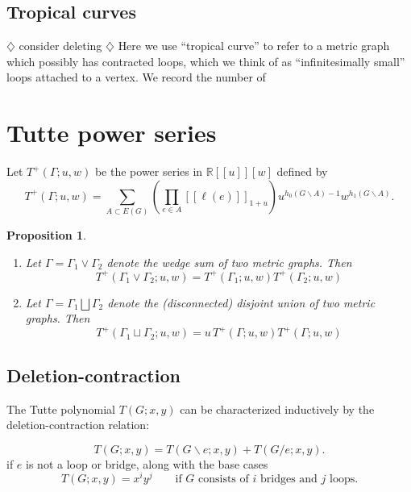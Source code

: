 \documentclass{amsart}
\newtheorem{prop}[thm]{Proposition}
\theoremstyle{definition}
\newcommand{\RR}{\mathbb{R}}
\newcommand{\fanalog}[2]{[\![#2]\!]_{#1}}
\newcommand{\harry}[1]{{\color{red} \sf $\diamondsuit$  {#1} $\diamondsuit$ }}
\newcommand{\note}[1]{\harry{#1}}
\begin{document}
\subsection{Tropical curves}

\note{consider deleting}
Here we use ``tropical curve'' 
to refer to a metric graph which possibly has contracted loops,
which we think of as ``infinitesimally small'' loops attached to a vertex.
We record the number of 


\section{Tutte power series}

Let $T^+(\Gamma; u,w)$ be the power series in $\RR[[u]][w]$
defined by
\begin{equation}
	T^+(\Gamma; u,w) = \sum_{A \subset E(G)} \left( \prod_{e \in A} \fanalog{1 + u}{\ell(e)} \right)
	u^{h_0(G\backslash A) - 1}w^{h_1(G\backslash A)} .
\end{equation}


\begin{prop}
\hfill
\begin{enumerate}
\item 
Let $\Gamma = \Gamma_1 \vee \Gamma_2$ denote the wedge sum of two metric graphs. Then
\[
	T^+(\Gamma_1 \vee \Gamma_2; u,w) = T^+(\Gamma_1; u,w) T^+(\Gamma_2; u,w)
\]

\item 
Let $\Gamma = \Gamma_1 \bigsqcup \Gamma_2$ denote the (disconnected) disjoint union of two metric graphs. Then
\[
	T^+(\Gamma_1 \sqcup \Gamma_2; u,w) = u\, T^+(\Gamma; u,w) T^+(\Gamma; u,w)
\]

\end{enumerate}
\end{prop}


\subsection{Deletion-contraction}
The Tutte polynomial $T(G; x,y)$ can be characterized inductively by the deletion-contraction relation:

\begin{equation*}
T(G;x,y) = T(G \backslash e; x,y) + T(G / e; x,y).
\end{equation*}
if $e$ is not a loop or bridge,
along with the base cases 
\begin{equation*}
T(G; x,y) = x^i y^j \qquad\text{if $G$ consists of $i$ bridges and $j$ loops.}
\end{equation*}
\end{document}
